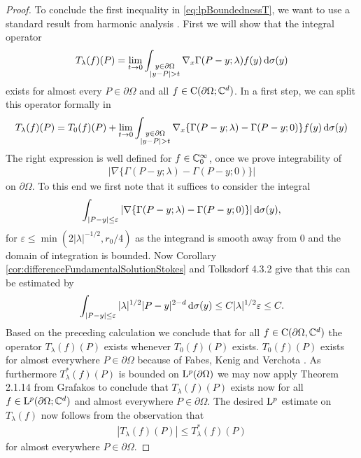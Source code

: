 \begin{proof}
   To conclude the first inequality in \eqref{eq:lpBoundednessT}, we want to use a standard result from harmonic analysis \cite[2.1.14]{grafakos}.
   First we will show that the integral operator
   \begin{align*}
     T_\lambda(f)(P) = \lim_{t \to 0} \int_{\substack{y \in \partial\Omega \\ |y - P| > t}} \nabla_x \Gamma(P - y; \lambda) f(y) \, {\operatorname{d}\!{\sigma}}(y)
   \end{align*}
   exists for almost every $P \in \partial\Omega$ and all $f \in \mathrm{C}(\partial\Omega; \mathbb{C}^d)$.
   In a first step, we can split this operator formally in
   \begin{align*}
     T_\lambda(f)(P) = T_0(f)(P) + \lim_{t \to 0} \int_{\substack{y \in \partial\Omega \\ |y - P| > t}} \nabla_x \{ \Gamma(P - y; \lambda) - \Gamma(P - y; 0)\}  f(y) \, {\operatorname{d}\!{\sigma}}(y)
   \end{align*}
   The right expression is well defined for $f \in \mathbb{C}_0^\infty$, once we prove integrability of 
   \begin{align*}
     |\nabla \{\Gamma(P - y; \lambda) - \Gamma(P - y; 0)\} |
   \end{align*}
   on $\partial\Omega$.
   To this end we first note that it suffices to consider the integral
   \begin{align*}
     \int_{|P - y| \leq \varepsilon} | \nabla\{ \Gamma(P - y; \lambda) - \Gamma(P - y; 0) \} | \, {\operatorname{d}\!{\sigma}}(y), 
   \end{align*}
   for $\varepsilon \leq \min(2|\lambda|^{-1/2}, r_0/4)$ as the integrand is smooth away from $0$ and the domain of integration is bounded.
   Now Corollary \ref{cor:differenceFundamentalSolutionStokes} and Tolksdorf 4.3.2 give that this can be estimated by
   \begin{align*}
     \int_{|P - y| \leq \varepsilon} |\lambda|^{1/2} |P - y|^{2 - d} \, {\operatorname{d}\!{\sigma}}(y) \leq C |\lambda|^{1/2} \varepsilon \leq C.
   \end{align*}
   Based on the preceding calculation we conclude that for all $f \in \mathrm{C}(\partial\Omega,\mathbb{C}^d)$ the operator $T_\lambda(f)(P)$ exists whenever $T_0(f)(P)$ exists.
   $T_0(f)(P)$ exists for almost everywhere $P \in \partial\Omega$ because of Fabes, Kenig and Verchota \cite{fabesKenigVerchota}.
   As furthermore $T_\lambda^*(f)(P)$ is bounded on $\mathrm{L}^p(\partial\Omega)$  we may now apply Theorem 2.1.14 from Grafakos \cite{grafakos} to conclude that $T_\lambda(f)(P)$ exists now for all $f \in \mathrm{L}^p(\partial\Omega; \mathbb{C}^d)$ and almost everywhere $P \in \partial\Omega$.
   The desired $\mathrm{L}^p$ estimate on $T_\lambda(f)$ now follows from the observation that 
   \begin{align*}
     | T_\lambda(f)(P) | \leq T_\lambda^*(f)(P)
   \end{align*}
   for almost everywhere $P \in \partial\Omega$.
\end{proof}

